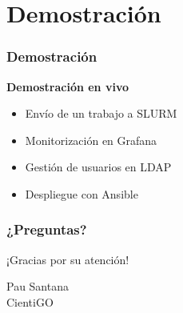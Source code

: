 \documentclass[aspectratio=169]{beamer}
\begin{document}
\section{Demostración}

\begin{frame}
\frametitle{Demostración}
\begin{center}
\Large{\textbf{Demostración en vivo}}

\vspace{0.5cm}
\begin{itemize}
    \item Envío de un trabajo a SLURM
    \item Monitorización en Grafana
    \item Gestión de usuarios en LDAP
    \item Despliegue con Ansible
\end{itemize}
\end{center}
\end{frame}
\begin{frame}
\frametitle{¿Preguntas?}
\begin{center}
\Huge{¡Gracias por su atención!}

\vspace{1cm}
\large{Pau Santana}\\
\large{CientiGO}
\end{center}
\end{frame}
\end{document}
